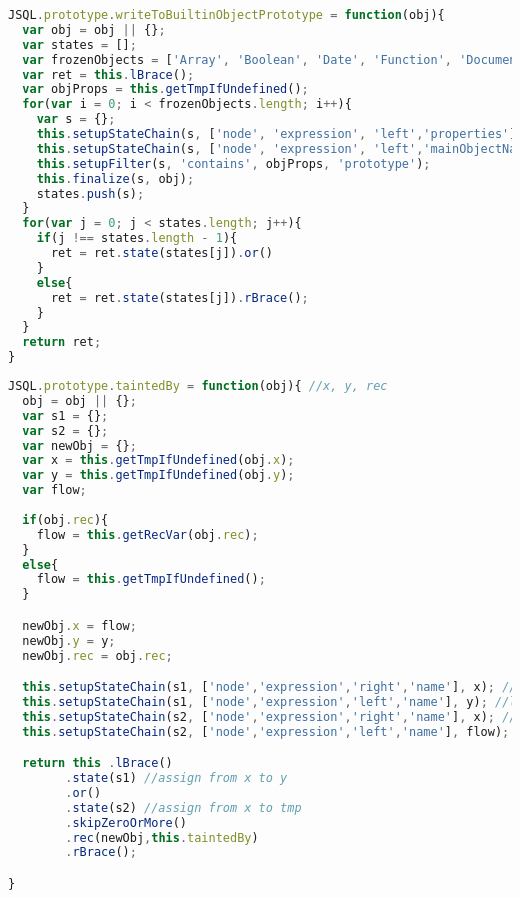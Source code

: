 \documentclass[a4paper, 12pt]{report}
\begin{document}
\begin{appendices}
\begin{lstlisting}[label={lst:assignPredicate},language=JavaScript,caption=The \texttt{assign} predicate,mathescape=true]
JSQL.prototype.writeToBuiltinObjectPrototype = function(obj){
  var obj = obj || {};
  var states = [];
  var frozenObjects = ['Array', 'Boolean', 'Date', 'Function', 'Document', 'Math', 'Window','String'];
  var ret = this.lBrace();
  var objProps = this.getTmpIfUndefined();
  for(var i = 0; i < frozenObjects.length; i++){
    var s = {};
    this.setupStateChain(s, ['node', 'expression', 'left','properties'], objProps);
    this.setupStateChain(s, ['node', 'expression', 'left','mainObjectName'], frozenObjects[i]);
    this.setupFilter(s, 'contains', objProps, 'prototype');
    this.finalize(s, obj);
    states.push(s);
  }
  for(var j = 0; j < states.length; j++){
    if(j !== states.length - 1){
      ret = ret.state(states[j]).or()
    }
    else{
      ret = ret.state(states[j]).rBrace();
    }
  }
  return ret;
}
\end{lstlisting}

\begin{lstlisting}[label={lst:taintedBy},language=JavaScript,caption=The \texttt{taintedBy} recursive policy,mathescape=true]  % float=t?
JSQL.prototype.taintedBy = function(obj){ //x, y, rec
  obj = obj || {};
  var s1 = {};
  var s2 = {};
  var newObj = {};
  var x = this.getTmpIfUndefined(obj.x);
  var y = this.getTmpIfUndefined(obj.y);
  var flow;
  
  if(obj.rec){
    flow = this.getRecVar(obj.rec);
  }
  else{
    flow = this.getTmpIfUndefined();
  }

  newObj.x = flow;
  newObj.y = y;
  newObj.rec = obj.rec;

  this.setupStateChain(s1, ['node','expression','right','name'], x); //alias
  this.setupStateChain(s1, ['node','expression','left','name'], y); //leaked
  this.setupStateChain(s2, ['node','expression','right','name'], x); //alias
  this.setupStateChain(s2, ['node','expression','left','name'], flow); //leaked

  return this .lBrace()
        .state(s1) //assign from x to y
        .or()
        .state(s2) //assign from x to tmp
        .skipZeroOrMore()
        .rec(newObj,this.taintedBy)
        .rBrace();

}
\end{lstlisting}

\begin{lstlisting}[label={lst:WriteToBuiltinObjectPrototype},language=JavaScript,caption=The \texttt{writeToBuiltinObjectPrototype} policy,mathescape=true]  % float=t?


\end{lstlisting}
\end{appendices}
\end{document}
